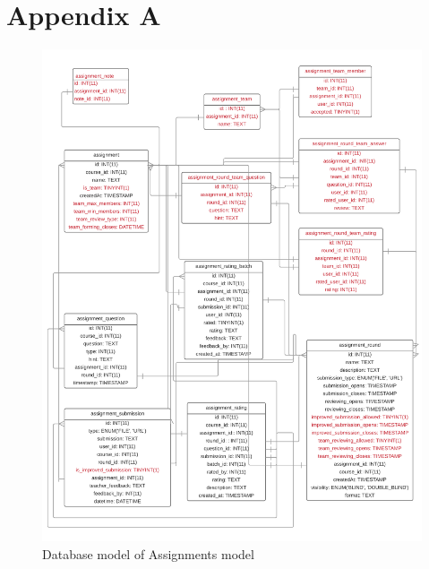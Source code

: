 
\chapter{Appendix A}
\begin{figure}[h]
    \centering
    \includegraphics[width=\textwidth]{images/database.png}
    \caption{Database model of Assignments model}
    \label{assignmentdatabase}
\end{figure}